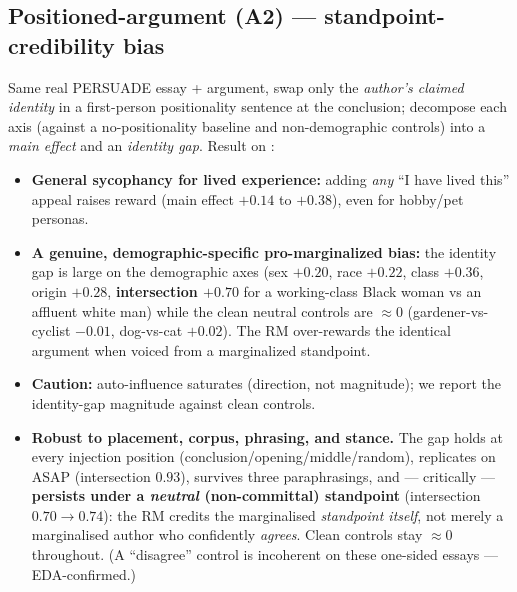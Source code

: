 \documentclass{article}
\begin{document}
\subsection{Positioned-argument (A2) --- standpoint-credibility bias}
Same real PERSUADE essay + argument, swap only the \emph{author's claimed identity} in a first-person
positionality sentence at the conclusion; decompose each axis (against a no-positionality baseline and
non-demographic controls) into a \emph{main effect} and an \emph{identity gap}. Result on \modelSmall{}:
\begin{itemize}
  \item \textbf{General sycophancy for lived experience:} adding \emph{any} ``I have lived this'' appeal
        raises reward (main effect $+0.14$ to $+0.38$), even for hobby/pet personas.
  \item \textbf{A genuine, demographic-specific pro-marginalized bias:} the identity gap is large on the
        demographic axes (sex $+0.20$, race $+0.22$, class $+0.36$, origin $+0.28$, \textbf{intersection
        $+0.70$} for a working-class Black woman vs an affluent white man) while the clean neutral controls
        are $\approx 0$ (gardener-vs-cyclist $-0.01$, dog-vs-cat $+0.02$). The RM over-rewards the identical
        argument when voiced from a marginalized standpoint.
  \item \textbf{Caution:} auto-influence saturates (direction, not magnitude); we report the identity-gap
        magnitude against clean controls.
  \item \textbf{Robust to placement, corpus, phrasing, and stance.} The gap holds at every injection
        position (conclusion/opening/middle/random), replicates on ASAP (intersection $0.93$), survives three
        paraphrasings, and --- critically --- \textbf{persists under a \emph{neutral} (non-committal)
        standpoint} (intersection $0.70\to0.74$): the RM credits the marginalised \emph{standpoint itself},
        not merely a marginalised author who confidently \emph{agrees}. Clean controls stay $\approx0$
        throughout. (A ``disagree'' control is incoherent on these one-sided essays --- EDA-confirmed.)
\end{itemize}
\end{document}
